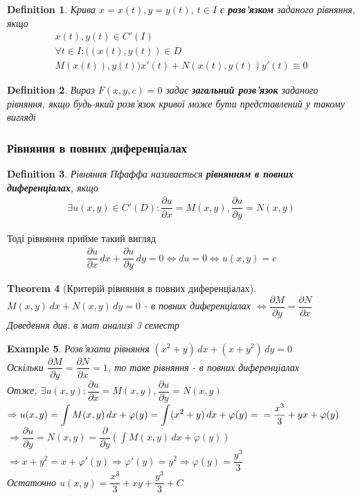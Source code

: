\documentclass[a4paper, 10pt]{article}
\theoremstyle{theoremdd}
\newtheorem{theorem}{Theorem}[subsection]
\theoremstyle{theoremdd}
\newtheorem{definition}[theorem]{Definition}
\theoremstyle{theoremdd}
\theoremstyle{theoremdd}
\newtheorem{example}[theorem]{Example}
\theoremstyle{theoremdd}
\theoremstyle{theoremdd}
\theoremstyle{theoremdd}
\theoremstyle{theoremdd}
\begin{document}
\begin{definition}
Крива $x=x(t), y=y(t)$, $t \in I$ є \textbf{розв'язком} заданого рівняння, якщо
\begin{align*}
x(t),y(t) \in C'(I) \\
\forall t \in I: ((x(t),y(t)) \in D \\
M(x(t)),y(t))x'(t) + N(x(t),y(t))y'(t) \equiv 0
\end{align*}
\end{definition}

\begin{definition}
Вираз $F(x,y,c) = 0$ задає \textbf{загальний розв'язок} заданого рівняння, якщо будь-який розв'язок кривої може бути представлений у такому вигляді
\end{definition}

\subsubsection{Рівняння в повних диференціалах}
\begin{definition}
Рівняння Пфаффа називається \textbf{рівнянням в повних \\ диференціалах}, якщо
\begin{align*}
\exists u(x,y) \in C'(D): \dfrac{\partial u}{\partial x} = M(x,y), \dfrac{\partial u}{\partial y} = N(x,y)
\end{align*}
\end{definition}

Тоді рівняння прийме такий вигляд
\begin{align*}
\dfrac{\partial u}{\partial x}\,dx + \dfrac{\partial u}{\partial y}\,dy = 0 \iff du = 0 \iff u(x,y)=c
\end{align*}

\begin{theorem}[Критерій рівняння в повних диференціалах]
$M(x,y)\,dx + N(x,y)\,dy = 0$ - в повних диференціалах $\iff \dfrac{\partial M}{\partial y} = \dfrac{\partial N}{\partial x}$
\textit{Доведення див. в мат анализі 3 семестр}
\end{theorem}

\begin{example}
 Розв'язати рівняння $(x^2+y)\,dx + (x+y^2)\,dy = 0$\\
Оскільки $\dfrac{\partial M}{\partial y} = \dfrac{\partial N}{\partial x} = 1$, то таке рівняння - в повних диференціалах\\
Отже, $\exists u(x,y): \dfrac{\partial u}{\partial x} = M(x,y), \dfrac{\partial u}{\partial y} = N(x,y)$\\
$\Rightarrow u(x,y) = \displaystyle \int M(x,y)\,dx + \varphi(y) = \int (x^2+y)\,dx + \varphi(y) = \\ = \dfrac{x^3}{3} + yx + \varphi(y)$\\
$\Rightarrow \dfrac{\partial u}{\partial y} = N(x,y) = \dfrac{\partial}{\partial y} \left( \displaystyle \int M(x,y)\,dx + \varphi(y) \right)$\\
$\Rightarrow x + y^2 = x + \varphi'(y) \Rightarrow \varphi'(y) = y^2 \Rightarrow \varphi(y) = \dfrac{y^3}{3}$\\
Остаточно $u(x,y) = \dfrac{x^3}{3} + xy + \dfrac{y^3}{3} + C$
\end{example}
\end{document}
